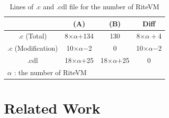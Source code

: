 \documentclass{sig-alternate-05-2015}
\begin{document}
\begin{table}[t]
    \centering
    \caption{Lines of .c and .cdl file for the number of RiteVM}
    \scriptsize
    {\tabcolsep=0.1cm
    \begin{tabular}{c||cc|c}
                & (A)       & (B)     & Diff  \\ \hline
        .c (Total)      & 8$\times$$\alpha$$+$134  & 130     & 8$\times$$\alpha+$4\\
        .c (Modification)   & 10$\times\alpha$$-$2 & 0   &  10$\times\alpha$$-$2 \\
        .cdl    & 18$\times$$\alpha$$+$25   & 18$\times$$\alpha$$+$25 & 0     \\
        \multicolumn{3}{l}{{\small $\alpha$} : {\scriptsize the number of RiteVM}}
    \end{tabular}
    }
    \label{tab:codesize}
\end{table}

\section{Related Work}
\label{sec:Related work}
\end{document}
